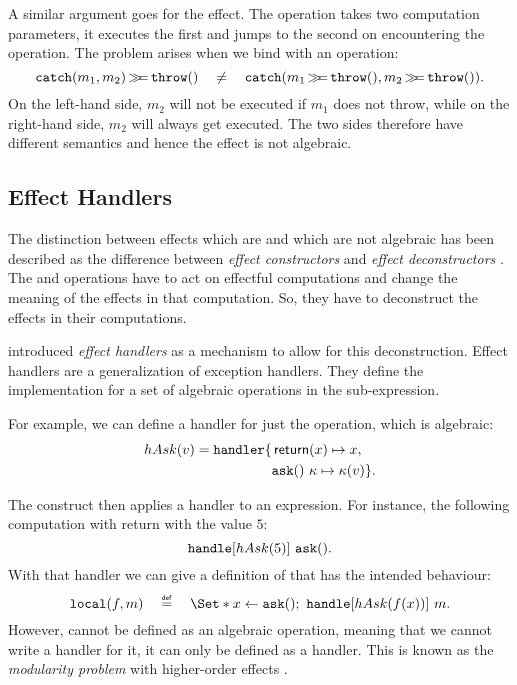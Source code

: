 A similar argument goes for the  effect. The \ocatch operation takes two computation parameters, it executes the first and jumps to the second on encountering the \othrow operation. The problem arises when we bind with an \othrow operation:
\[
    \mathtt{catch}(m_1, m_2) \operatorname{\mathtt{\gg\!\!=}} \mathtt{throw}() \quad\neq\quad \mathtt{catch}(m_1\operatorname{\mathtt{\gg\!\!=}}\mathtt{throw}(), m_2\operatorname{\mathtt{\gg\!\!=}}\mathtt{throw}()).
\]
On the left-hand side, $m_2$ will not be executed if $m_1$ does not throw, while on the right-hand side, $m_2$ will always get executed. The two sides therefore have different semantics and hence the \ocatch effect is not algebraic. 

\subsection{Effect Handlers}


The distinction between effects which are and which are not algebraic has been described as the difference between \emph{effect constructors} and \emph{effect deconstructors} \autocite{plotkin_algebraic_2003}. The \olocal and \ocatch operations have to act on effectful computations and change the meaning of the effects in that computation. So, they have to deconstruct the effects in their computations.

\textcite{castagna_handlers_2009} introduced \emph{effect handlers} as a mechanism to allow for this deconstruction. Effect handlers are a generalization of exception handlers. They define the implementation for a set of algebraic operations in the sub-expression.

For example, we can define a handler for just the \oask operation, which is algebraic:
\[
    hAsk(v) = \text{\texttt{handler}} \{
        \begin{aligned}[t]
            &\operatorname{\mathsf{return}}(x) \mapsto x, \\
            &\mathtt{ask}()\ \kappa \mapsto \kappa(v) \}.\\
        \end{aligned}
\]

The \handle construct then applies a handler to an expression. For instance, the following computation with return with the value $5$:
\[
    \text{\texttt{handle}}[hAsk(5)]\ \mathtt{ask}().
\]
With that handler we can give a definition of \olocal that has the intended behaviour:
\[
    \olocal(f, m) \quad\defeq\quad \S{x \gets \oask()\seq \handle[hAsk(f(x))]\ m}.
\]
However, \olocal cannot be defined as an algebraic operation, meaning that we cannot write a handler for it, it can only be defined as a handler. This is known as the \emph{modularity problem} with higher-order effects \autocite{wu_effect_2014}.

